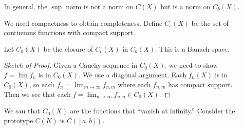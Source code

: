 \documentclass[10pt, twoside]{article}
\begin{document}
    \begin{rmk} In general, the $\sup$ norm is not a norm on $C(X)$ but is a
    norm on $C_b(X)$.  \end{rmk}

    We need compactness to obtain completeness. Define $C_c(X)$ be the set of
    continuous functions with compact support. 
    
    \begin{thm} Let $C_0(X)$ be the closure of $C_c(X)$ in $C_b(X)$. This is a
        Banach space.  \begin{proof}[Sketch of Proof] Given a Cauchy sequence
            in $C_0(X)$, we need to show $f = \lim f_n$ is in $C_0(X)$. We use
            a diagonal argument.  Each $f_n(X)$ is in $C_0(X)$, so each $f_n =
            \lim_{m \rightarrow \infty} f_{n,m}$ where each $f_{n,m}$ has
            compact support. Then we see that each $f = \lim_{n \rightarrow
            \infty} f_{n,n} \in C_0(X)$.  \end{proof} \end{thm}

    We sau that $C_0(X)$ are the functions that ``vanish at infinity.''
    Consider the prototype $C(K)$ is $C([a,b])$. 
\end{document}
